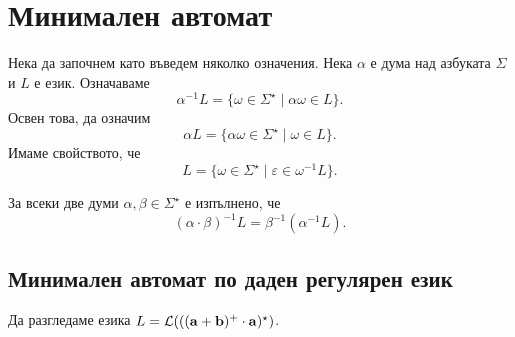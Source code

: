 \section{Минимален автомат}

Нека да започнем като въведем няколко означения.
Нека $\alpha$ е дума над азбуката $\Sigma$  и $L$ е език. Означаваме 
\[\alpha^{-1}L = \{\omega \in \Sigma^\star \mid \alpha\omega \in L\}.\]
Освен това, да означим 
\[\alpha L = \{\alpha\omega \in \Sigma^\star \mid \omega \in L\}.\]
Имаме свойството, че
\[L = \{\omega \in \Sigma^\star \mid \varepsilon \in \omega^{-1}L\}.\]

\begin{prop}
  За всеки две думи $\alpha, \beta \in \Sigma^\star$ е изпълнено, че 
  \[(\alpha\cdot\beta)^{-1}L = \beta^{-1}(\alpha^{-1}L).\]
\end{prop}

\subsection{Минимален автомат по даден регулярен език}
Да разгледаме езика $L = \mathcal{L}(\mathbf{((a+b)^+\cdot a)^\star})$.


